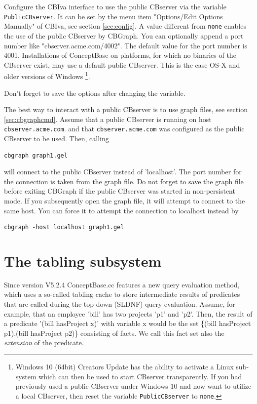 Configure the CBIva interface to use the public CBserver via the variable {\tt PublicCBserver}.
It can be set by the menu item "Options/Edit Options Manually" of CBIva, see section \ref{sec:config}.
A value different from {\tt none} enables the use of the public CBserver by CBGraph.
You can optionally append a port number like "cbserver.acme.com/4002". The default value
for the port number is 4001. Installations of ConceptBase on platforms, for which no binaries of the CBserver
exist, may use a default public CBserver. This is the case OS-X and older versions of Windows%
\footnote{Windows 10 (64bit) Creators Update has the ability to activate a Linux sub-system
which can then be used to start CBserver transparently.
If you had previously used a public CBserver under Windows 10 and now want to utilize a local CBserver,
then reset the variable {\tt PublicCBserver} to {\tt none}.}.

Don't forget to save the options after changing the variable.


The best way to interact with a public CBserver is to use graph files, see section
\ref{sec:cbgraphcmd}. Assume that a public CBserver is running on host {\tt cbserver.acme.com}.
and that {\tt cbserver.acme.com} was configured as the public CBserver to be used.
Then, calling

\begin{verbatim}
cbgraph graph1.gel 
\end{verbatim}

will connect to the public CBserver instead of 'localhost'. The port number for the connection is taken
from the graph file.
Do not forget to save the graph file before exiting CBGraph if the public CBserver was started
in non-persistent mode.
If you subsequently open the graph file, it will attempt to connect to the same host.
You can force it to attempt the connection to localhost instead by

\begin{verbatim}
cbgraph -host localhost graph1.gel 
\end{verbatim}





\section{The tabling subsystem}
\label{sec:cbcache}

Since version V5.2.4 ConceptBase.cc features a new query evaluation method,
which uses a so-called tabling cache to store intermediate results of predicates
that are called during the top-down (SLDNF) query evaluation. Assume, for example, that
an employee 'bill' has two projects 'p1' and 'p2'. Then, the
result of a predicate '(bill hasProject x)' with variable x would be
the set \{(bill hasProject p1),(bill hasProject p2)\} consisting of facts. 
We call this fact set also the {\em extension} of the predicate.

